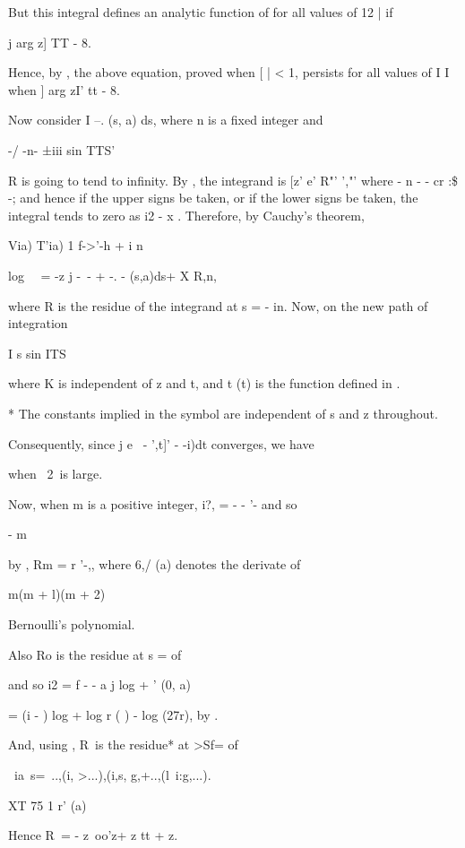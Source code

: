 {{But this integral defines an analytic function of for all values of 12
| if

j arg z] TT - 8.

Hence, by , the above equation, proved when [ | < 1, persists for
all values of I I when ] arg zI' tt - 8.

Now consider I --. (s, a) ds, where n is a fixed integer and

-/ -n- ±iii sin TTS'

R is going to tend to infinity. By , the integrand is [z' e'
R"' ',"' where - n - - cr :\$ -; and hence if the upper signs be
taken, or if the lower signs be taken, the integral tends to zero as
i2 - x . Therefore, by Cauchy's theorem,

Via) T'ia) 1 f->'-h + i n

log \ \ = -z j -~- + -. - (s,a)ds+ X R,n,

where R is the residue of the integrand at s = - in. Now, on the new
path of integration

I s sin ITS \

where K is independent of z and t, and t (t) is the function defined
in .

* The constants implied in the symbol are independent of s and z
throughout.

%
%

Consequently, since j e~ - ',t]' - -i)dt converges, we have

when \ 2\ is large.

Now, when m is a positive integer, i?, = - - '- and so

- m

by , Rm = r '-,, where 6,/ (a) denotes the derivate of

m(m + l)(m + 2)

Bernoulli's polynomial.

Also Ro is the residue at s = of

and so i2 = f - - a j log + ' (0, a)

= (i - ) log + log r ( ) - log (27r), by .

And, using , R\, is the residue* at >Sf= of

\ ia\ s=\ ..,(i, >...),(i,s, g,+..,(l\ i:g,...).

XT 75 1 r' (a)

Hence R\ = - z\ oo'z+ z tt + z.

}}

